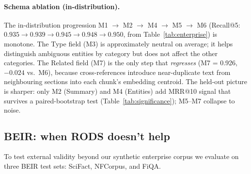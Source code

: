 \documentclass[11pt]{article}
\begin{document}
\paragraph{Schema ablation (in-distribution).}
The in-distribution progression M1 $\to$ M2 $\to$ M4 $\to$ M5 $\to$ M6
(Recall@5: $0.935 \to 0.939 \to 0.945 \to 0.948 \to 0.950$, from
Table~\ref{tab:enterprise}) is monotone. The Type field (M3) is
approximately neutral on average; it helps distinguish ambiguous
entities by category but does not affect the other categories. The
Related field (M7) is the only step that \emph{regresses} (M7 = 0.926,
$-0.024$ vs.\ M6), because cross-references introduce near-duplicate
text from neighbouring sections into each chunk's embedding centroid.
The held-out picture is sharper: only M2 (Summary) and M4 (Entities)
add MRR@10 signal that survives a paired-bootstrap test
(Table~\ref{tab:significance}); M5--M7 collapse to noise.

\subsection{BEIR: when RODS doesn't help}
\label{sec:beir}

To test external validity beyond our synthetic enterprise corpus we
evaluate on three BEIR test sets: SciFact, NFCorpus, and FiQA.
\end{document}
